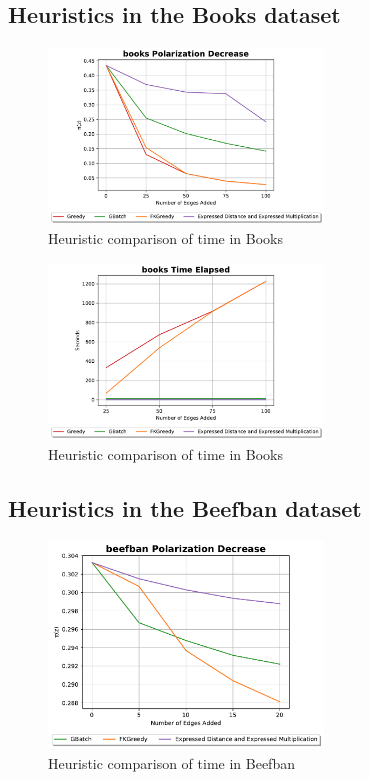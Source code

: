 \clearpage

\subsection{Heuristics in the Books dataset}

\begin{figure}[!htbp]
	\centering
	\includegraphics[width=0.65\textwidth]{Figures/books Polarization Decrease}
	\caption{Heuristic comparison of time in Books}
	\label{fig:books_pol}
\end{figure}


\begin{figure}[!htbp]
	\centering
	\includegraphics[width=0.65\textwidth]{Figures/books Time Elapsed}
	\caption{Heuristic comparison of time in Books}
	\label{fig:books_time}
\end{figure}


\clearpage


\subsection{Heuristics in the Beefban dataset}

\begin{figure}[!htbp]
	\centering
	\includegraphics[width=0.65\textwidth]{Figures/beefban Polarization Decrease}
	\caption{Heuristic comparison of time in Beefban}
	\label{fig:beefban_pol}
\end{figure}


